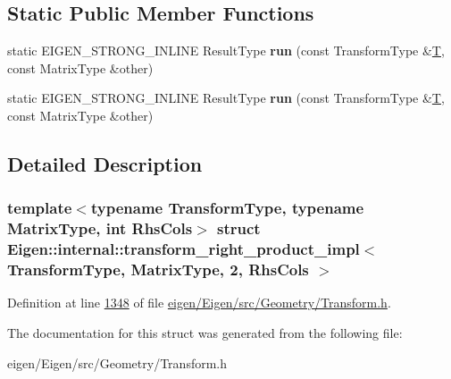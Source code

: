 \subsection*{Static Public Member Functions}
\begin{DoxyCompactItemize}
\item 
\mbox{\label{struct_eigen_1_1internal_1_1transform__right__product__impl_3_01_transform_type_00_01_matrix_type_00_012_00_01_rhs_cols_01_4_af28512e23bf6a5bb85f2edcb2cd5d793}} 
static E\+I\+G\+E\+N\+\_\+\+S\+T\+R\+O\+N\+G\+\_\+\+I\+N\+L\+I\+NE Result\+Type {\bfseries run} (const Transform\+Type \&\hyperlink{group___sparse_core___module}{T}, const Matrix\+Type \&other)
\item 
\mbox{\label{struct_eigen_1_1internal_1_1transform__right__product__impl_3_01_transform_type_00_01_matrix_type_00_012_00_01_rhs_cols_01_4_af28512e23bf6a5bb85f2edcb2cd5d793}} 
static E\+I\+G\+E\+N\+\_\+\+S\+T\+R\+O\+N\+G\+\_\+\+I\+N\+L\+I\+NE Result\+Type {\bfseries run} (const Transform\+Type \&\hyperlink{group___sparse_core___module}{T}, const Matrix\+Type \&other)
\end{DoxyCompactItemize}


\subsection{Detailed Description}
\subsubsection*{template$<$typename Transform\+Type, typename Matrix\+Type, int Rhs\+Cols$>$\newline
struct Eigen\+::internal\+::transform\+\_\+right\+\_\+product\+\_\+impl$<$ Transform\+Type, Matrix\+Type, 2, Rhs\+Cols $>$}



Definition at line \hyperlink{eigen_2_eigen_2src_2_geometry_2_transform_8h_source_l01348}{1348} of file \hyperlink{eigen_2_eigen_2src_2_geometry_2_transform_8h_source}{eigen/\+Eigen/src/\+Geometry/\+Transform.\+h}.



The documentation for this struct was generated from the following file\+:\begin{DoxyCompactItemize}
\item 
eigen/\+Eigen/src/\+Geometry/\+Transform.\+h\end{DoxyCompactItemize}
